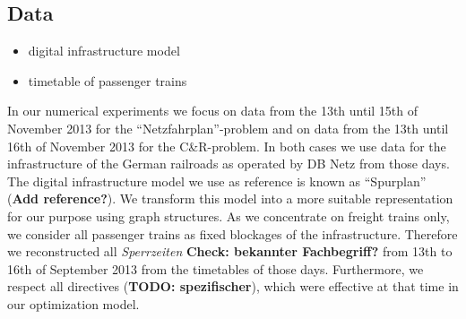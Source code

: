 \subsection{Data}
\begin{itemize}
  \item digital infrastructure model
  \item timetable of passenger trains
\end{itemize}
In our numerical experiments we focus on data from the 13th until 15th of November 2013 for the ``Netzfahrplan''-problem and on data from the 13th until 16th of November 2013 for the C\&R-problem. In both cases we use data for the infrastructure of the German railroads as operated by DB Netz from those days. The digital infrastructure model we use as reference is known as ``Spurplan'' (\textbf{Add reference?}). We transform this model into a more suitable representation for our purpose using graph structures. As we concentrate on freight trains only, we consider all passenger trains as fixed blockages of the infrastructure. Therefore we reconstructed all \textit{Sperrzeiten} \textbf{Check: bekannter Fachbegriff?} from 13th to 16th of September 2013 from the timetables of those days. Furthermore, we respect all directives (\textbf{TODO: spezifischer}), which were effective at that time in our optimization model.

